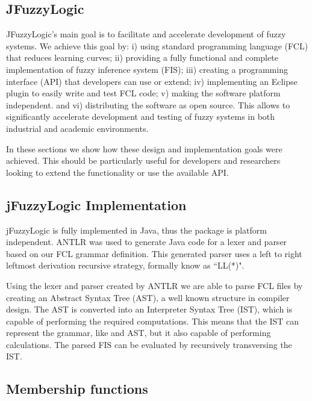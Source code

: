 \documentclass[11pt,twoside]{article}
\begin{document}
\begin{multicols}{2}
\section{JFuzzyLogic \label{sec:jFu}}

JFuzzyLogic's main goal is to facilitate and accelerate development of fuzzy systems.
We achieve this goal by:
i) using standard programming language (FCL) that reduces learning curves;
ii) providing a fully functional and complete implementation of fuzzy inference system (FIS);
iii) creating a programming interface (API) that developers can use or extend;
iv) implementing an Eclipse plugin to easily write and test FCL code;
v) making the software platform independent.
 and vi) distributing the software as open source. 
This allows to significantly accelerate development and testing of fuzzy systems in both industrial and academic environments.

In these sections we show how these design and implementation goals were achieved.
This should be particularly useful for developers and researchers looking to extend the functionality or use the available API.

\subsection{jFuzzyLogic Implementation \label{sec:implement}}

jFuzzyLogic is fully implemented in Java, thus the package is platform independent. 
ANTLR\cite{parr2007definitive} was used to generate Java code for a lexer and parser based on our FCL grammar definition.
This generated parser uses a left to right leftmost derivation recursive strategy, formally know as ``LL(*)".

Using the lexer and parser created by ANTLR we are able to parse FCL files by creating an Abstract Syntax Tree (AST), a well known structure in compiler design.
The AST is converted into an Interpreter Syntax Tree (IST), which is capable of performing the required computations.
This means that the IST can represent the grammar, like and AST, but it also capable of performing calculations.
The parsed FIS can be evaluated by recursively transversing the IST.

\subsection{Membership functions \label{sec:memFun}}


\end{multicols}
\end{document}
